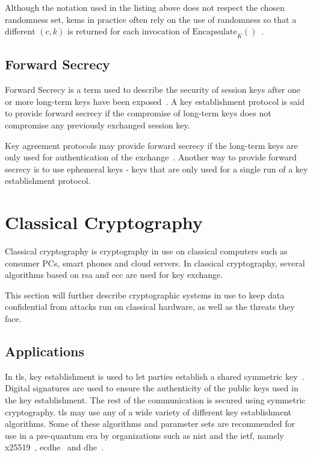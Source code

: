 Although the notation used in the listing above does not respect the chosen randomness set, \glspl{kem} in practice often rely on the use of randomness so that a different $(c,k)$ is returned for each invocation of $\text{Encapsulate}_K()$~\cite{boyd2020}. 

\subsection{Forward Secrecy}

Forward Secrecy is a term used to describe the security of session keys after one or more long-term keys have been exposed~\cite{boyd2020}. A key establishment protocol is said to provide forward secrecy if the compromise of long-term keys does not compromise any previously exchanged session key.

Key agreement protocols may provide forward secrecy if the long-term keys are only used for authentication of the exchange~\cite{boyd2020}. Another way to provide forward secrecy is to use ephemeral keys - keys that are only used for a single run of a key establishment protocol.

\section{Classical Cryptography}
\label{section:background:classical-cryptography}

Classical cryptography is cryptography in use on classical computers such as consumer PCs, smart phones and cloud servers. In classical cryptography, several algorithms based on \gls{rsa} and \gls{ecc} are used for key exchange.

This section will further describe cryptographic systems in use to keep data confidential from attacks run on classical hardware, as well as the threats they face.

\subsection{Applications}
\label{section:background:classical-cryptography:applications}

In \acrfull{tls}, key establishment is used to let parties establish a shared symmetric key~\cite{bernstein2017}. Digital signatures are used to ensure the authenticity of the public keys used in the key establishment. The rest of the communication is secured using symmetric cryptography. \gls{tls} may use any of a wide variety of different key establishment algorithms. Some of these algorithms and parameter sets are recommended for use in a pre-quantum era by organizations such as \gls{nist} and the \gls{ietf}, namely \gls{x25519}~\cite{rfc7748}, \gls{ecdhe}~\cite{nist2019} and \gls{dhe}~\cite{nist2019}.

